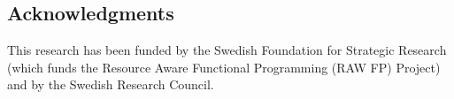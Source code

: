 

\subsection*{Acknowledgments} %
This research has been funded by the Swedish Foundation for
Strategic Research (which funds the Resource Aware Functional 
Programming (RAW FP) Project) and by the Swedish Research Council.










